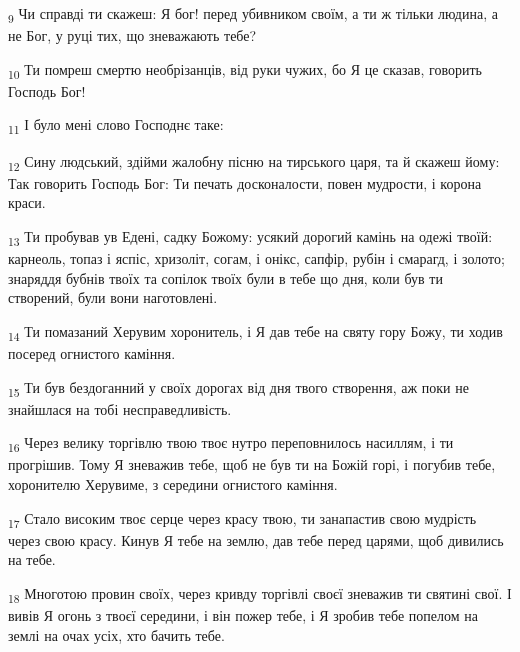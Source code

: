 \begin{tcolorbox}
\textsubscript{9} Чи справді ти скажеш: Я бог! перед убивником своїм, а ти ж тільки людина, а не Бог, у руці тих, що зневажають тебе?
\end{tcolorbox}
\begin{tcolorbox}
\textsubscript{10} Ти помреш смертю необрізанців, від руки чужих, бо Я це сказав, говорить Господь Бог!
\end{tcolorbox}
\begin{tcolorbox}
\textsubscript{11} І було мені слово Господнє таке:
\end{tcolorbox}
\begin{tcolorbox}
\textsubscript{12} Сину людський, здійми жалобну пісню на тирського царя, та й скажеш йому: Так говорить Господь Бог: Ти печать досконалости, повен мудрости, і корона краси.
\end{tcolorbox}
\begin{tcolorbox}
\textsubscript{13} Ти пробував ув Едені, садку Божому: усякий дорогий камінь на одежі твоїй: карнеоль, топаз і яспіс, хризоліт, согам, і онікс, сапфір, рубін і смарагд, і золото; знаряддя бубнів твоїх та сопілок твоїх були в тебе що дня, коли був ти створений, були вони наготовлені.
\end{tcolorbox}
\begin{tcolorbox}
\textsubscript{14} Ти помазаний Херувим хоронитель, і Я дав тебе на святу гору Божу, ти ходив посеред огнистого каміння.
\end{tcolorbox}
\begin{tcolorbox}
\textsubscript{15} Ти був бездоганний у своїх дорогах від дня твого створення, аж поки не знайшлася на тобі несправедливість.
\end{tcolorbox}
\begin{tcolorbox}
\textsubscript{16} Через велику торгівлю твою твоє нутро переповнилось насиллям, і ти прогрішив. Тому Я зневажив тебе, щоб не був ти на Божій горі, і погубив тебе, хоронителю Херувиме, з середини огнистого каміння.
\end{tcolorbox}
\begin{tcolorbox}
\textsubscript{17} Стало високим твоє серце через красу твою, ти занапастив свою мудрість через свою красу. Кинув Я тебе на землю, дав тебе перед царями, щоб дивились на тебе.
\end{tcolorbox}
\begin{tcolorbox}
\textsubscript{18} Многотою провин своїх, через кривду торгівлі своєї зневажив ти святині свої. І вивів Я огонь з твоєї середини, і він пожер тебе, і Я зробив тебе попелом на землі на очах усіх, хто бачить тебе.
\end{tcolorbox}

